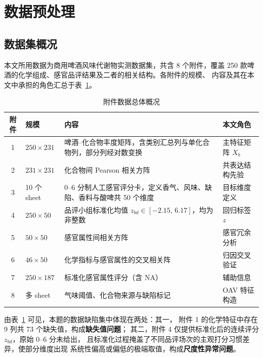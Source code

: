 \documentclass[12pt,a4paper]{article}
\begin{document}
\newcommand{\figph}[2][0.85\textwidth]{%
\fbox{\begin{minipage}[c][#1][c]{0.92\linewidth}
\centering\small\color{gray} #2\[2pt]（出图后替换为 \texttt{\textbackslash includegraphics}）
\end{minipage}}}

\section{数据预处理}

\subsection{数据集概况}

本文所用数据为商用啤酒风味代谢物实测数据集，共含 8 个附件，覆盖
250 款啤酒的化学组成、感官品评结果及二者的相关结构。各附件的规模、
内容及其在本文中承担的角色汇总于表~\ref{tab:data_overview}。

\begin{table}[htbp]
\centering
\caption{附件数据总体概况}
\label{tab:data_overview}
\begin{tabular}{cp{2.4cm}p{5.0cm}p{3.4cm}}
\hline
附件 & 规模 & 内容 & 本文角色 \\
\hline
1 & $250\times 231$ & 啤酒--化合物丰度矩阵，含类别汇总列与单化合物列，部分列经对数变换 & 主特征矩阵 $X_b$ \\
2 & $231\times 231$ & 化合物间 Pearson 相关方阵 & 共表达结构先验 \\
3 & 10 个 sheet & 0--6 分制人工感官评分卡，定义香气、风味、缺陷、香料与酸啤共 50 个维度 & 目标维度定义 \\
4 & $250\times 50$ & 品评小组标准化均值 $z_{bd}\in[-2.15,\,6.17]$，均为非整数 & 回归标签 $z$ \\
5 & $50\times 50$ & 感官属性间相关方阵 & 感官冗余分析 \\
6 & $46\times 50$ & 化学指标与感官属性的交叉相关阵 & 归因交叉验证 \\
7 & $250\times 187$ & 标准化感官属性评分（含 NA） & 辅助信息 \\
8 & 多 sheet & 气味阈值、化合物来源与缺陷标记 & OAV 特征构造 \\
\hline
\end{tabular}
\end{table}

由表~\ref{tab:data_overview} 可见，本题的数据缺陷集中体现在两处：其一，
附件 1 的化学特征中存在 9 列共 73 个缺失值，构成\textbf{缺失值问题}；
其二，附件 4 仅提供标准化后的连续评分 $z_{bd}$，原始 0--6 分未给出，
且标准化过程掩盖了不同品评场次的主观打分习惯差异，使部分维度出现
系统性偏高或偏低的极端取值，构成\textbf{尺度性异常问题}。
\end{document}
